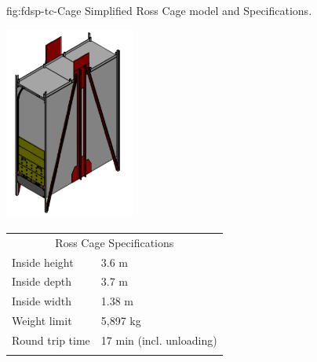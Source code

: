\begin{dunefigure}
{fig:fdsp-tc-Cage}
{Simplified Ross Cage model and Specifications.}
\parbox{1.5in}{\includegraphics[width=0.32\textwidth]{graphics/Cage-view.pdf}}
\qquad\hspace{60pt}
\begin{minipage}{0.5\textwidth}%
\begin{tabular}{p{3.4cm}p{3.4cm}}        
\multicolumn{2}{c}{Ross Cage Specifications}\\ \toprowrule
Inside height & 3.6 m\\ \colhline
Inside depth  & 3.7 m \\ \colhline
Inside width  & 1.38 m \\ \colhline
Weight limit  &  5,897 kg \\ \colhline
Round trip \newline time & 17 min \newline (incl. unloading) \\ \colhline
\end{tabular}
\end{minipage}
\end{dunefigure}

